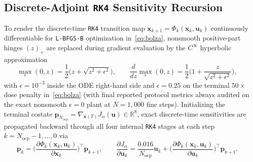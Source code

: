 \documentclass[11pt]{article}
\theoremstyle{plain}
\theoremstyle{remark}
\begin{document}
\subsection{Discrete-Adjoint \texttt{RK4} Sensitivity Recursion}
\label{app:adjoint}
To render the discrete-time \texttt{RK4} transition map $\mathbf{x}_{k+1} = \Phi_k(\mathbf{x}_k, \mathbf{u}_k)$ continuously differentiable for \texttt{L-BFGS-B} optimization \cite{byrd1995limited,virtanen2020scipy} in~\eqref{eq:bolza}, nonsmooth positive-part hinges $(z)_+$ are replaced during gradient evaluation by the $C^\infty$ hyperbolic approximation
\begin{equation}
  \max_\epsilon(0, z) = \frac{1}{2}\Big(z + \sqrt{z^2 + \epsilon^2}\Big), \qquad \frac{d}{dz}\max_\epsilon(0, z) = \frac{1}{2}\Big(1 + \frac{z}{\sqrt{z^2 + \epsilon^2}}\Big),
\end{equation}
with $\epsilon = 10^{-3}$ inside the ODE right-hand side and $\epsilon = 0.25$ on the terminal $50\times$ dose penalty in~\eqref{eq:bolza} (with final reported protocol metrics always audited on the exact nonsmooth $\epsilon = 0$ plant at $N = 1{,}000$ fine steps). Initializing the terminal costate $\mathbf{p}_{N_{\mathrm{ocp}}} = \nabla_{\mathbf{x}(T)} J_\alpha(\mathbf{u}) \in \mathbb{R}^8$, exact discrete-time sensitivities are propagated backward through all four internal \texttt{RK4} stages at each step $k = N_{\mathrm{ocp}} - 1, \dots, 0$ via
\begin{equation}
  \mathbf{p}_k = \Big(\frac{\partial \Phi_k(\mathbf{x}_k, \mathbf{u}_k)}{\partial \mathbf{x}_k}\Big)^\top \mathbf{p}_{k+1}, \qquad
  \frac{\partial J_\alpha}{\partial \mathbf{u}_k} = \frac{0.016}{N_{\mathrm{ocp}}}\mathbf{u}_k + \Big(\frac{\partial \Phi_k(\mathbf{x}_k, \mathbf{u}_k)}{\partial \mathbf{u}_k}\Big)^\top \mathbf{p}_{k+1}.
\end{equation}
\end{document}
